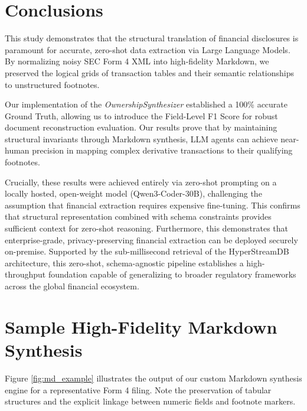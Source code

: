 \documentclass[journal, onecolumn]{IEEEtran}
\begin{document}
\section{Conclusions}
This study demonstrates that the structural translation of financial disclosures is paramount for accurate, zero-shot data extraction via Large Language Models. By normalizing noisy SEC Form 4 XML into high-fidelity Markdown, we preserved the logical grids of transaction tables and their semantic relationships to unstructured footnotes. 

Our implementation of the \textit{OwnershipSynthesizer} established a 100\% accurate Ground Truth, allowing us to introduce the Field-Level F1 Score for robust document reconstruction evaluation. Our results prove that by maintaining structural invariants through Markdown synthesis, LLM agents can achieve near-human precision in mapping complex derivative transactions to their qualifying footnotes.

Crucially, these results were achieved entirely via zero-shot prompting on a locally hosted, open-weight model (Qwen3-Coder-30B), challenging the assumption that financial extraction requires expensive fine-tuning. This confirms that structural representation combined with schema constraints provides sufficient context for zero-shot reasoning. Furthermore, this demonstrates that enterprise-grade, privacy-preserving financial extraction can be deployed securely on-premise. Supported by the sub-millisecond retrieval of the HyperStreamDB architecture, this zero-shot, schema-agnostic pipeline establishes a high-throughput foundation capable of generalizing to broader regulatory frameworks across the global financial ecosystem.




\newpage
\appendices
\section{Sample High-Fidelity Markdown Synthesis}
Figure \ref{fig:md_example} illustrates the output of our custom Markdown synthesis engine for a representative Form 4 filing. Note the preservation of tabular structures and the explicit linkage between numeric fields and footnote markers.
\end{document}
